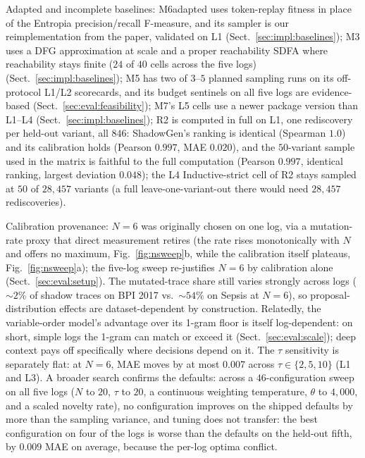 \documentclass[runningheads]{llncs}
\newcommand{\chg}[1]{#1}
\begin{document}
Adapted and incomplete baselines: M6adapted uses token-replay fitness in place of the Entropia precision/recall F-measure\chg{, and its sampler is our reimplementation from the paper, validated on L1} (Sect.~\ref{sec:impl:baselines}); M3 uses a DFG approximation \chg{at scale and a proper reachability SDFA where reachability stays finite ($24$ of $40$ cells across the five logs)} (Sect.~\ref{sec:impl:baselines}); M5 has two of $3$--$5$ planned sampling runs \chg{on its off-protocol L1/L2 scorecards, and its budget sentinels on all five logs are evidence-based (Sect.~\ref{sec:eval:feasibility})}; \chg{M7's L5 cells use a newer package version than L1--L4 (Sect.~\ref{sec:impl:baselines})}; \chg{R2 is computed in full on L1, one rediscovery per held-out variant, all $846$: ShadowGen's ranking is identical (Spearman $1.0$) and its calibration holds (Pearson $0.997$, MAE $0.020$), and the $50$-variant sample used in the matrix is faithful to the full computation (Pearson $0.997$, identical ranking, largest deviation $0.048$); the L4 Inductive-strict cell of R2 stays sampled at $50$ of $28{,}457$ variants (a full leave-one-variant-out there would need $28{,}457$ rediscoveries)}.

Calibration provenance: $N{=}6$ was originally chosen on one log, via a mutation-rate proxy that direct measurement retires (the rate rises monotonically with $N$ and offers no maximum, Fig.~\ref{fig:nsweep}b, while the calibration itself plateaus, Fig.~\ref{fig:nsweep}a); the five-log sweep re-justifies $N{=}6$ by calibration alone (Sect.~\ref{sec:eval:setup}). The mutated-trace share still varies strongly across logs ($\sim2\%$ of shadow traces on BPI 2017 vs.\ $\sim54\%$ on Sepsis at $N{=}6$), so proposal-distribution effects are dataset-dependent by construction. \chg{Relatedly, the variable-order model's advantage over its 1-gram floor is itself log-dependent: on short, simple logs the 1-gram can match or exceed it (Sect.~\ref{sec:eval:scale}); deep context pays off specifically where decisions depend on it.} \chg{The $\tau$ sensitivity is separately flat: at $N{=}6$, MAE moves by at most $0.007$ across $\tau\in\{2,5,10\}$ (L1 and L3).} \chg{A broader search confirms the defaults: across a $46$-configuration sweep on all five logs ($N$ to $20$, $\tau$ to $20$, a continuous weighting temperature, $\theta$ to $4{,}000$, and a scaled novelty rate), no configuration improves on the shipped defaults by more than the sampling variance, and tuning does not transfer: the best configuration on four of the logs is worse than the defaults on the held-out fifth, by $0.009$ MAE on average, because the per-log optima conflict.}
\end{document}
